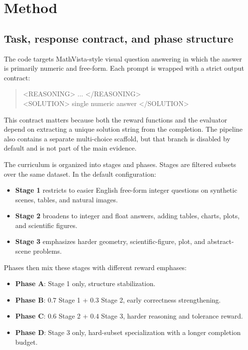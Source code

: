 \documentclass{article} %
\begin{document}
\section{Method}

\subsection{Task, response contract, and phase structure}

The code targets MathVista-style visual question answering in which the answer is primarily numeric and free-form. Each prompt is wrapped with a strict output contract:
\begin{quote}
\small\ttfamily
<REASONING> ... </REASONING>\\
<SOLUTION> single numeric answer </SOLUTION>
\end{quote}
This contract matters because both the reward functions and the evaluator depend on extracting a unique solution string from the completion. The pipeline also contains a separate multi-choice scaffold, but that branch is disabled by default and is not part of the main evidence.

The curriculum is organized into stages and phases. Stages are filtered subsets over the same dataset. In the default configuration:
\begin{itemize}[leftmargin=1.2em]
\item \textbf{Stage 1} restricts to easier English free-form integer questions on synthetic scenes, tables, and natural images.
\item \textbf{Stage 2} broadens to integer and float answers, adding tables, charts, plots, and scientific figures.
\item \textbf{Stage 3} emphasizes harder geometry, scientific-figure, plot, and abstract-scene problems.
\end{itemize}
Phases then mix these stages with different reward emphases:
\begin{itemize}[leftmargin=1.2em]
\item \textbf{Phase A}: Stage 1 only, structure stabilization.
\item \textbf{Phase B}: $0.7$ Stage 1 + $0.3$ Stage 2, early correctness strengthening.
\item \textbf{Phase C}: $0.6$ Stage 2 + $0.4$ Stage 3, harder reasoning and tolerance reward.
\item \textbf{Phase D}: Stage 3 only, hard-subset specialization with a longer completion budget.
\end{itemize}
\end{document}
